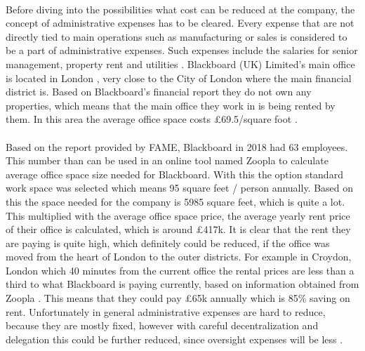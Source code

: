 \documentclass[]{article}
\begin{document}
\paragraph{}
Before diving into the possibilities what cost can be reduced at the company, the concept of administrative expenses has to be cleared. Every expense that are not directly tied to main operations such as manufacturing or sales is considered to be a part of administrative expenses. Such expenses include the salaries for senior management, property rent and utilities \cite{Investopedia-Administrative}. Blackboard (UK) Limited's main office is located in London \cite{GOV-BB}, very close to the City of London where the main financial district is. Based on Blackboard's financial report they do not own any properties, which means that the main office they work in is being rented by them. In this area the average office space costs £69.5/square foot \cite{Statista-Rent-London}. 

\paragraph{}
Based on the report provided by FAME, Blackboard in 2018 had 63 employees. This number than can be used in an online tool named Zoopla \cite{Zoopla} to calculate average office space size needed for Blackboard. With this the option standard work space was selected which means 95 square feet / person annually. Based on this the space needed for the company is 5985 square feet, which is quite a lot. This multiplied with the average office space price, the average yearly rent price of their office is calculated, which is around £417k. It is clear that the rent they are paying is quite high, which definitely could be reduced, if the office was moved from the heart of London to the outer districts. For example in Croydon, London which 40 minutes from the current office the rental prices are less than a third to what Blackboard is paying currently, based on information obtained from Zoopla \cite{Zoopla-search}. This means that they could pay £65k annually which is 85\% saving on rent. Unfortunately in general administrative expenses are hard to reduce, because they are mostly fixed, however with careful decentralization and delegation this could be further reduced, since oversight expenses will be less \cite{Investopedia-Administrative-reduce}. 
\end{document}
